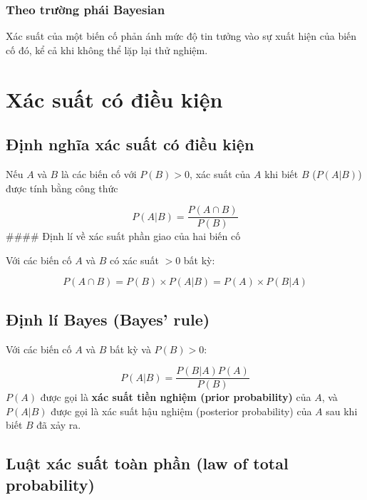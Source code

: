 \documentclass[
]{book}
\begin{document}
\hypertarget{theo-trux1b0ux1eddng-phuxe1i-bayesian}{%
\subsubsection{Theo trường phái Bayesian}\label{theo-trux1b0ux1eddng-phuxe1i-bayesian}}

Xác suất của một biến cố phản ánh mức độ tin tưởng vào sự xuất hiện của biến cố đó, kể cả khi không thể lặp lại thử nghiệm.

\hypertarget{xuxe1c-suux1ea5t-cuxf3-ux111iux1ec1u-kiux1ec7n}{%
\section{Xác suất có điều kiện}\label{xuxe1c-suux1ea5t-cuxf3-ux111iux1ec1u-kiux1ec7n}}

\hypertarget{ux111ux1ecbnh-nghux129a-xuxe1c-suux1ea5t-cuxf3-ux111iux1ec1u-kiux1ec7n}{%
\subsection{Định nghĩa xác suất có điều kiện}\label{ux111ux1ecbnh-nghux129a-xuxe1c-suux1ea5t-cuxf3-ux111iux1ec1u-kiux1ec7n}}

Nếu \(A\) và \(B\) là các biến cố với \(P(B) > 0\), xác suất của \(A\) khi biết \(B\) (\(P(A | B)\)) được tính bằng công thức

\[
P(A|B) = \frac{P(A \cap B)}{P(B)}
\]
\#\#\#\# Định lí về xác suất phần giao của hai biến cố

Với các biến cố \(A\) và \(B\) có xác suất \(>0\) bất kỳ:

\[
P(A \cap B) = P(B) \times P(A|B) = P(A) \times P(B|A)
\]

\hypertarget{ux111ux1ecbnh-luxed-bayes-bayes-rule}{%
\subsection{Định lí Bayes (Bayes' rule)}\label{ux111ux1ecbnh-luxed-bayes-bayes-rule}}

Với các biến cố \(A\) và \(B\) bất kỳ và \(P(B) > 0\):

\[
P(A|B) = \frac{P(B|A)P(A)}{P(B)}
\]
\(P(A)\) được gọi là \textbf{xác suất tiền nghiệm (prior probability)} của \(A\), và \(P(A|B)\) được gọi là xác suất hậu nghiệm (posterior probability) của \(A\) sau khi biết \(B\) đã xảy ra.

\hypertarget{luux1eadt-xuxe1c-suux1ea5t-touxe0n-phux1ea7n-law-of-total-probability}{%
\subsection{Luật xác suất toàn phần (law of total probability)}\label{luux1eadt-xuxe1c-suux1ea5t-touxe0n-phux1ea7n-law-of-total-probability}}
\end{document}
